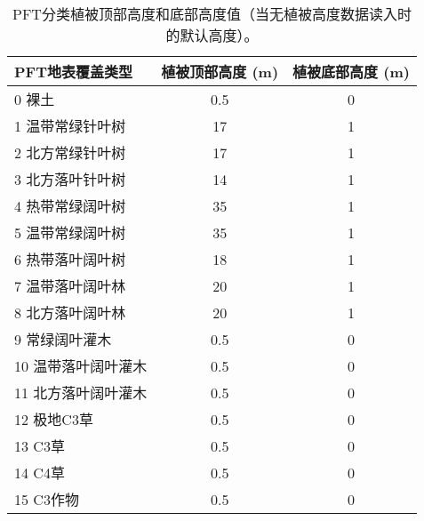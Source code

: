 \begin{table}[]
    \centering
    \caption{PFT分类植被顶部高度和底部高度值（当无植被高度数据读入时的默认高度）。}
    \label{tab:PFT分类植被顶部高度和底部高度值}
    \begin{tabular}{@{}lcc@{}}
    \toprule
    PFT地表覆盖类型     & 植被顶部高度 (m) & 植被底部高度 (m) \\ \midrule
    0 裸土           & 0.5          & 0          \\%
    1 温带常绿针叶树   & 17           & 1          \\
    2 北方常绿针叶树   & 17           & 1          \\
    3 北方落叶针叶树   & 14           & 1          \\
    4 热带常绿阔叶树   & 35           & 1          \\
    5 温带常绿阔叶树   & 35           & 1          \\
    6 热带落叶阔叶树   & 18           & 1          \\
    7 温带落叶阔叶林   & 20           & 1          \\
    8 北方落叶阔叶林   & 20           & 1          \\
    9 常绿阔叶灌木    & 0.5          & 0           \\
    10 温带落叶阔叶灌木 & 0.5          & 0          \\
    11 北方落叶阔叶灌木 & 0.5          & 0          \\
    12 极地C3草    & 0.5          & 0          \\
    13 C3草      & 0.5          & 0          \\
    14 C4草      & 0.5          & 0          \\
    15 C3作物     & 0.5          & 0          \\ \bottomrule

    \end{tabular}
\end{table}

